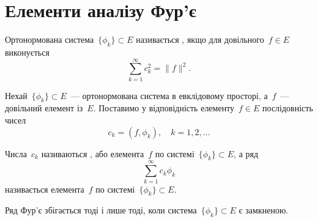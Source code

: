 \section{Елементи аналізу Фур'є}

\begin{definition}
    Ортонормована система~$\{\phi_k\} \subset E$ називається , якщо для довільного~$f \in E$ виконується 
    \begin{equation}
        \sum_{k = 1}^\infty c_k^2 = \|f\|^2.
    \end{equation}
\end{definition}

\begin{definition}
    Нехай~$\{\phi_k\} \subset E$~--- ортонормована система в евклідовому просторі, а~$f$~--- довільний елемент із~$E$. Поставимо у відповідність елементу~$f \in E$ послідовність чисел
    \begin{equation*}
        c_k = (f, \phi_k), \quad k = 1, 2, \dots
    \end{equation*}
    
    Числа~$c_k$ називаються , або  елемента~$f$ по системі~$\{\phi_k\} \subset E$, а ряд
    \begin{equation*}
        \sum_{k = 1}^\infty c_k \phi_k
    \end{equation*}
    називається  елемента~$f$ по системі~$\{\phi_k\} \subset E$.
\end{definition}

\begin{theorem}
    Ряд Фур'є збігається тоді і лише тоді, коли система~$\{\phi_k\} \subset E$ є замкненою.
\end{theorem}

